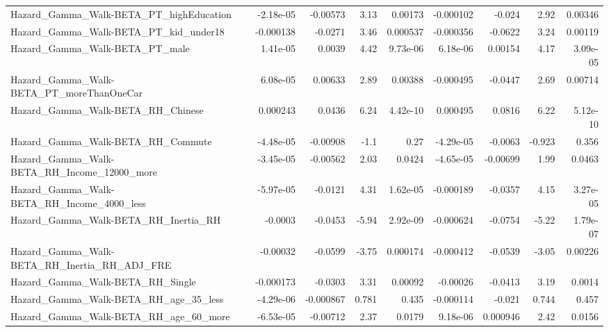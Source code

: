 \begin{tabular}{lrrrrrrrr}
Hazard\_Gamma\_Walk-BETA\_PT\_highEducation            &   -2.18e-05 &     -0.00573 &     3.13 &  0.00173 &  -0.000102 &      -0.024 &         2.92 &       0.00346 \\
Hazard\_Gamma\_Walk-BETA\_PT\_kid\_under18              &   -0.000138 &      -0.0271 &     3.46 & 0.000537 &  -0.000356 &     -0.0622 &         3.24 &       0.00119 \\
Hazard\_Gamma\_Walk-BETA\_PT\_male                     &    1.41e-05 &       0.0039 &     4.42 & 9.73e-06 &   6.18e-06 &     0.00154 &         4.17 &      3.09e-05 \\
Hazard\_Gamma\_Walk-BETA\_PT\_moreThanOneCar           &    6.08e-05 &      0.00633 &     2.89 &  0.00388 &  -0.000495 &     -0.0447 &         2.69 &       0.00714 \\
Hazard\_Gamma\_Walk-BETA\_RH\_Chinese                  &    0.000243 &       0.0436 &     6.24 & 4.42e-10 &   0.000495 &      0.0816 &         6.22 &      5.12e-10 \\
Hazard\_Gamma\_Walk-BETA\_RH\_Commute                  &   -4.48e-05 &     -0.00908 &     -1.1 &     0.27 &  -4.29e-05 &     -0.0063 &       -0.923 &         0.356 \\
Hazard\_Gamma\_Walk-BETA\_RH\_Income\_12000\_more        &   -3.45e-05 &     -0.00562 &     2.03 &   0.0424 &  -4.65e-05 &    -0.00699 &         1.99 &        0.0463 \\
Hazard\_Gamma\_Walk-BETA\_RH\_Income\_4000\_less         &   -5.97e-05 &      -0.0121 &     4.31 & 1.62e-05 &  -0.000189 &     -0.0357 &         4.15 &      3.27e-05 \\
Hazard\_Gamma\_Walk-BETA\_RH\_Inertia\_RH               &     -0.0003 &      -0.0453 &    -5.94 & 2.92e-09 &  -0.000624 &     -0.0754 &        -5.22 &      1.79e-07 \\
Hazard\_Gamma\_Walk-BETA\_RH\_Inertia\_RH\_ADJ\_FRE       &    -0.00032 &      -0.0599 &    -3.75 & 0.000174 &  -0.000412 &     -0.0539 &        -3.05 &       0.00226 \\
Hazard\_Gamma\_Walk-BETA\_RH\_Single                   &   -0.000173 &      -0.0303 &     3.31 &  0.00092 &   -0.00026 &     -0.0413 &         3.19 &        0.0014 \\
Hazard\_Gamma\_Walk-BETA\_RH\_age\_35\_less              &   -4.29e-06 &    -0.000867 &    0.781 &    0.435 &  -0.000114 &      -0.021 &        0.744 &         0.457 \\
Hazard\_Gamma\_Walk-BETA\_RH\_age\_60\_more              &   -6.53e-05 &     -0.00712 &     2.37 &   0.0179 &   9.18e-06 &    0.000946 &         2.42 &        0.0156 \\

\end{tabular}
